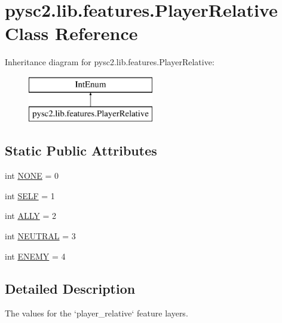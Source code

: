 \hypertarget{classpysc2_1_1lib_1_1features_1_1_player_relative}{}\section{pysc2.\+lib.\+features.\+Player\+Relative Class Reference}
\label{classpysc2_1_1lib_1_1features_1_1_player_relative}
Inheritance diagram for pysc2.\+lib.\+features.\+Player\+Relative\+:\begin{figure}[H]
\begin{center}
\leavevmode
\includegraphics[height=2.000000cm]{classpysc2_1_1lib_1_1features_1_1_player_relative}
\end{center}
\end{figure}
\subsection*{Static Public Attributes}
\begin{DoxyCompactItemize}
\item 
int \mbox{\hyperlink{classpysc2_1_1lib_1_1features_1_1_player_relative_a21e8a8563e8a0ab164af1c9f6d9d1387}{N\+O\+NE}} = 0
\item 
int \mbox{\hyperlink{classpysc2_1_1lib_1_1features_1_1_player_relative_a1814fca8de9c266a082c20514456ebfa}{S\+E\+LF}} = 1
\item 
int \mbox{\hyperlink{classpysc2_1_1lib_1_1features_1_1_player_relative_ae0c9ce2469ca17e68986bb3db8538d8d}{A\+L\+LY}} = 2
\item 
int \mbox{\hyperlink{classpysc2_1_1lib_1_1features_1_1_player_relative_a389a16bcd7781e679c995d91b7e8b9f5}{N\+E\+U\+T\+R\+AL}} = 3
\item 
int \mbox{\hyperlink{classpysc2_1_1lib_1_1features_1_1_player_relative_a803b17b26fbbf5fc750a396aaa27a49c}{E\+N\+E\+MY}} = 4
\end{DoxyCompactItemize}


\subsection{Detailed Description}
\begin{DoxyVerb}The values for the `player_relative` feature layers.\end{DoxyVerb}
 

